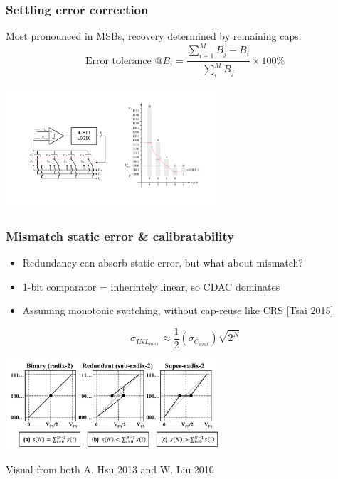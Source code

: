 \documentclass[aspectratio=169]{beamer}
\begin{document}
\begin{frame}
\frametitle{Settling error correction}
Most pronounced in MSBs, recovery determined by remaining caps:
\begin{equation*}
\textrm{Error tolerance @} B_i = \frac{\sum_{i+1}^{M}B_j - B_i} {\sum_{i}^{M}B_j} \times 100 \%
\end{equation*}
\begin{center}
\includegraphics[width=0.6\textwidth]{tranchar2.pdf}
\end{center}
\end{frame}

\begin{frame}
\frametitle{Mismatch static error \& calibratability}
\begin{itemize}
  \item Redundancy can absorb static error, but what about mismatch?
  \item 1-bit comparator = inherintely linear, so CDAC dominates
  \item Assuming monotonic switching, without cap-reuse like CRS [Tsai 2015]
\end{itemize}
\begin{equation*}
\sigma_{INL_{max}} \approx \frac{1}{2}(\sigma_{C_{unit}})\sqrt{2^N}
\end{equation*}
  \begin{center}
  \includegraphics[width=0.6\textwidth]{calibrate.png}
  \end{center}
  Visual from both A. Hsu 2013 and W. Liu 2010
\end{frame}
\end{document}
